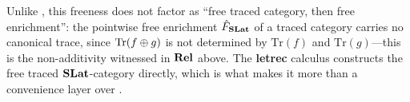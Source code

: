 \begin{remark}

Unlike , this freeness does not factor as \enquote{free traced category, then free enrichment}: the pointwise free enrichment $\hat{F}_{\mathbf{SLat}}$ of a traced category carries no canonical trace, since $\text{Tr}(f \mathbin{\oplus} g)$ is not determined by $\text{Tr}(f)$ and $\text{Tr}(g)$---this is the non-additivity witnessed in $\mathbf{Rel}$ above.
The \textbf{letrec} calculus constructs the free traced $\mathbf{SLat}$-category directly, which is what makes it more than a convenience layer over .
\end{remark}
